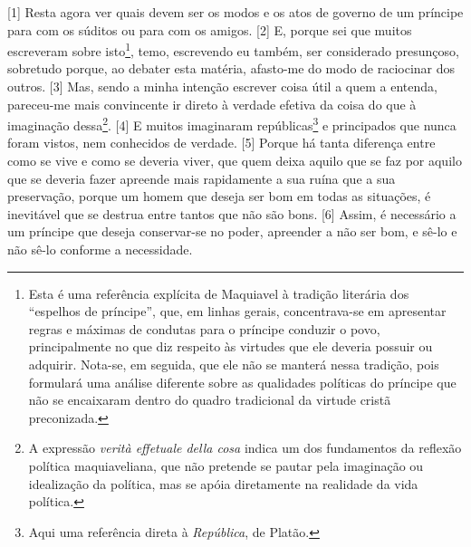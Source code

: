 {[}1{]} Resta agora ver quais devem ser os modos e os atos de governo de
um príncipe para com os súditos ou para com os amigos. {[}2{]} E, porque
sei que muitos escreveram sobre isto\footnote{Esta é uma referência
  explícita de Maquiavel à tradição literária dos ``espelhos de
  príncipe'', que, em linhas gerais, concentrava-se em apresentar regras
  e máximas de condutas para o príncipe conduzir o povo, principalmente
  no que diz respeito às virtudes que ele deveria possuir ou adquirir.
  Nota-se, em seguida, que ele não se manterá nessa tradição, pois
  formulará uma análise diferente sobre as qualidades políticas do
  príncipe que não se encaixaram dentro do quadro tradicional da virtude
  cristã preconizada.}, temo, escrevendo eu também, ser considerado
presunçoso, sobretudo porque, ao debater esta matéria, afasto-me do modo
de raciocinar dos outros. {[}3{]} Mas, sendo a minha intenção escrever
coisa útil a quem a entenda, pareceu-me mais convincente ir direto à
verdade efetiva da coisa do que à imaginação dessa\footnote{A expressão
  \emph{verità effetuale della cosa} indica um dos fundamentos da
  reflexão política maquiaveliana, que não pretende se pautar pela
  imaginação ou idealização da política, mas se apóia diretamente na
  realidade da vida política.}. {[}4{]} E muitos imaginaram
repúblicas\footnote{Aqui uma referência direta à \emph{República}, de
  Platão.} e principados que nunca foram vistos, nem conhecidos de
verdade. {[}5{]} Porque há tanta diferença entre como se vive e como se
deveria viver, que quem deixa aquilo que se faz por aquilo que se
deveria fazer apreende mais rapidamente a sua ruína que a sua
preservação, porque um homem que deseja ser bom em todas as situações, é
inevitável que se destrua entre tantos que não são bons. {[}6{]} Assim,
é necessário a um príncipe que deseja conservar-se no poder, apreender a
não ser bom, e sê-lo e não sê-lo conforme a necessidade.

